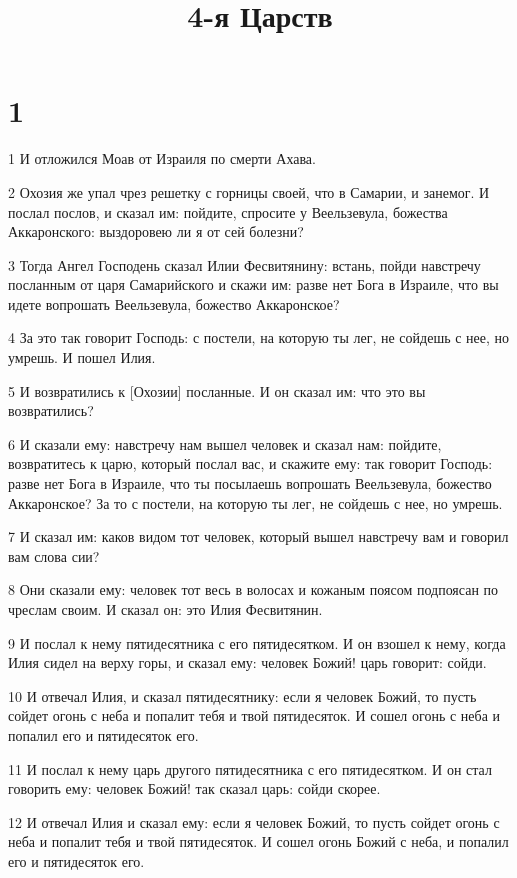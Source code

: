 

\title{4-я Царств}


\chapter{1}

\par 1 И отложился Моав от Израиля по смерти Ахава.
\par 2 Охозия же упал чрез решетку с горницы своей, что в Самарии, и занемог. И послал послов, и сказал им: пойдите, спросите у Веельзевула, божества Аккаронского: выздоровею ли я от сей болезни?
\par 3 Тогда Ангел Господень сказал Илии Фесвитянину: встань, пойди навстречу посланным от царя Самарийского и скажи им: разве нет Бога в Израиле, что вы идете вопрошать Веельзевула, божество Аккаронское?
\par 4 За это так говорит Господь: с постели, на которую ты лег, не сойдешь с нее, но умрешь. И пошел Илия.
\par 5 И возвратились к [Охозии] посланные. И он сказал им: что это вы возвратились?
\par 6 И сказали ему: навстречу нам вышел человек и сказал нам: пойдите, возвратитесь к царю, который послал вас, и скажите ему: так говорит Господь: разве нет Бога в Израиле, что ты посылаешь вопрошать Веельзевула, божество Аккаронское? За то с постели, на которую ты лег, не сойдешь с нее, но умрешь.
\par 7 И сказал им: каков видом тот человек, который вышел навстречу вам и говорил вам слова сии?
\par 8 Они сказали ему: человек тот весь в волосах и кожаным поясом подпоясан по чреслам своим. И сказал он: это Илия Фесвитянин.
\par 9 И послал к нему пятидесятника с его пятидесятком. И он взошел к нему, когда Илия сидел на верху горы, и сказал ему: человек Божий! царь говорит: сойди.
\par 10 И отвечал Илия, и сказал пятидесятнику: если я человек Божий, то пусть сойдет огонь с неба и попалит тебя и твой пятидесяток. И сошел огонь с неба и попалил его и пятидесяток его.
\par 11 И послал к нему царь другого пятидесятника с его пятидесятком. И он стал говорить ему: человек Божий! так сказал царь: сойди скорее.
\par 12 И отвечал Илия и сказал ему: если я человек Божий, то пусть сойдет огонь с неба и попалит тебя и твой пятидесяток. И сошел огонь Божий с неба, и попалил его и пятидесяток его.
